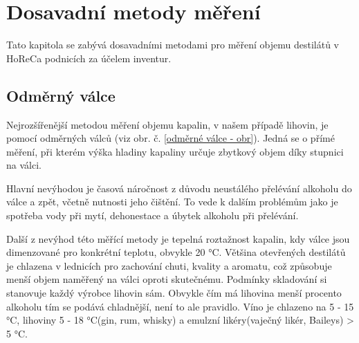 \chapter{Dosavadní metody měření}
\label{Dosavadní metody měření}
Tato kapitola se zabývá dosavadními metodami pro měření objemu destilátů v HoReCa podnicích za účelem inventur.

\section{Odměrný válce}
\label{Dosavadní metody měření - valce}



Nejrozšířenější metodou měření objemu kapalin, v našem případě lihovin, je pomocí odměrných válců (viz obr. č. \ref{odměrné válce - obr}). Jedná se o přímé měření, při kterém výška hladiny kapaliny určuje zbytkový objem díky stupnici na válci.

Hlavní nevýhodou je časová náročnost z důvodu neustálého přelévání alkoholu do válce a zpět, včetně nutnosti 
jeho čištění. To vede k dalším problémům jako je spotřeba vody při mytí, dehonestace a úbytek alkoholu při přelévání.

Další z nevýhod této měřící metody je tepelná roztažnost kapalin, kdy válce jsou dimenzované pro 
konkrétní teplotu, obvykle 20 °C. Většina otevřených destilátů je chlazena v lednicích pro zachování chuti, kvality a aromatu, což způsobuje menší objem naměřený na válci oproti skutečnému. Podmínky skladování si stanovuje každý výrobce lihovin sám. Obvykle čím má lihovina menší procento alkoholu tím se podává chladnější, není to ale pravidlo. Víno je chlazeno na 5 - 15 °C, lihoviny 5 - 18 °C(gin, rum, whisky) a emulzní likéry(vaječný likér, Baileys) > 5 °C. 
	
